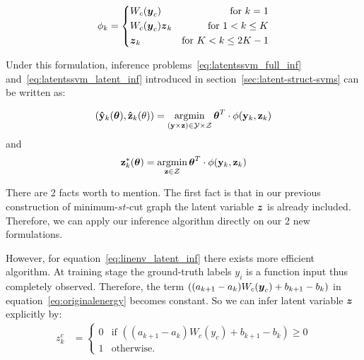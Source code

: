 \begin{equation}
\label{eq:llsvm_feature}
  \phi_k = \left\{
		\begin{aligned}
      & W_c({\boldsymbol{y}}_c) 	& \text{for} \ k=1\\
      & W_c({\boldsymbol{y}}_c){\boldsymbol{z}}_k & \text{for}\ 1<k\le K\\
      & {\boldsymbol{z}}_k & \text{for} \ K<k\le2K-1\\
		\end{aligned}
  \right.
\end{equation}

Under this formulation, inference
problems~\eqref{eq:latentssvm_full_inf}
and~\eqref{eq:latentssvm_latent_inf} introduced in
section~\ref{sec:latent-struct-svms} can be written as:

\begin{align}
  \label{eq:linenv_full_inf}
  (\mathbf{\hat{y}}_k(\boldsymbol{\theta}),\mathbf{\hat{z}}_k(\theta))=\mathop{\textrm{argmin}}_{(\mathbf{y}
  \times \mathbf{z}) \in \mathcal{Y} \times \mathcal{Z}}
  \boldsymbol{\theta}^T\cdot\phi(\mathbf{y}_k,\mathbf{z}_k)
\end{align}
and
\begin{align}
  \label{eq:linenv_latent_inf}
  \mathbf{z}^*_k(\boldsymbol{\theta}) = \mathop{\textrm{argmin}}_{\mathbf{z} \in \mathcal{Z}}
  \boldsymbol{\theta}^T \cdot \phi(\mathbf{y}_k,\mathbf{z}_k)
\end{align}

There are 2 facts worth to mention. The first fact is
that in our previous construction of minimum-$st$-cut graph the
latent variable ${\boldsymbol{z}}$ is already included. Therefore, we can
apply our inference algorithm directly on our 2 new formulations.

However, for equation~\eqref{eq:linenv_latent_inf} there exists
more efficient algorithm. At training stage the ground-truth
labels $y_i$ is a function input thus completely observed.
Therefore, the term $((a_{k+1}-a_k)W_c({\boldsymbol{y}}_c)+b_{k+1}-b_k)$ in
equation~\ref{eq:originalenergy} becomes constant. So we can
infer latent variable ${\boldsymbol{z}}$ explicitly by:
\begin{align}
  \label{eq:linenv_effi_infer_latent}
  z_k^c &=
          \begin{cases}
            0 & \text{if $((a_{k+1}-a_k)W_c(y_c)+b_{k+1}-b_k)\geq0$} \\
            1 & \text{otherwise}.
          \end{cases}
\end{align}


